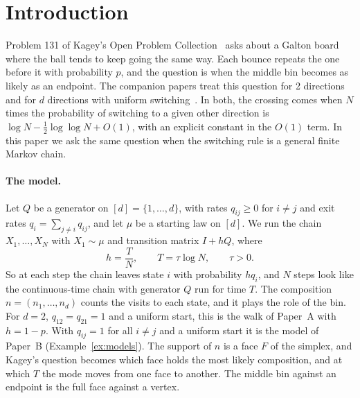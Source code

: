 \section{Introduction}\label{sec:intro}

Problem 131 of Kagey's Open Problem Collection~\cite{kagey131} asks about
a Galton board where the ball tends to keep going the same way. Each bounce
repeats the one before it with probability $p$, and the question is when
the middle bin becomes as likely as an endpoint. The companion papers treat
this question for 2 directions~\cite{paperA} and for $d$ directions with
uniform switching~\cite{paperB}. In both, the crossing comes when $N$ times
the probability of switching to a given other direction is
$\log N-\frac12\log\log N+O(1)$, with an explicit constant in the $O(1)$
term. In this paper we ask the same question when the switching rule is a
general finite Markov chain.

\paragraph{The model.}
Let $Q$ be a generator on $[d]=\{1,\dots,d\}$, with rates $q_{ij}\ge0$ for
$i\ne j$ and exit rates $q_i=\sum_{j\ne i}q_{ij}$, and let $\mu$ be a
starting law on $[d]$. We run the chain $X_1,\dots,X_N$ with $X_1\sim\mu$
and transition matrix $I+hQ$, where
\[
 h=\frac TN,\qquad T=\tau\log N,\qquad \tau>0 .
\]
So at each step the chain leaves state $i$ with probability $hq_i$, and
$N$ steps look like the continuous-time chain with generator $Q$ run for
time $T$. The composition $n=(n_1,\dots,n_d)$ counts the visits to each
state, and it plays the role of the bin. For $d=2$, $q_{12}=q_{21}=1$ and a
uniform start, this is the walk of Paper~A with $h=1-p$. With $q_{ij}=1$ for
all $i\ne j$ and a uniform start it is the model of Paper~B
(Example~\ref{ex:models}). The
support of $n$ is a face $F$ of the simplex, and Kagey's question becomes
which face holds the most likely composition, and at which $T$ the mode
moves from one face to another. The middle bin against an endpoint is the
full face against a vertex.

